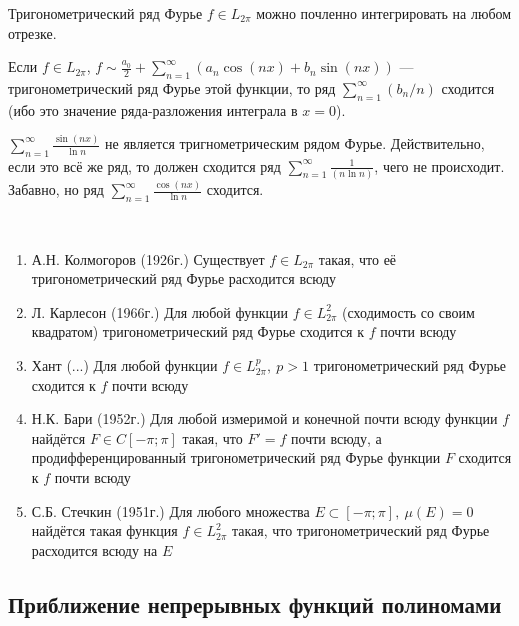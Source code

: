 \begin{corollary}
	Тригонометрический ряд Фурье $f \in L_{2\pi}$ можно почленно интегрировать на любом отрезке.
\end{corollary}

\begin{corollary}
	Если $f \in L_{2\pi}$, $f \sim \frac{a_0}{2} + \sum_{n = 1}^\infty (a_n\cos(nx) + b_n\sin(nx))$ --- тригонометрический ряд Фурье этой функции, то ряд $\sum_{n = 1}^\infty (b_n / n)$ сходится (ибо это значение ряда-разложения интеграла в $x = 0$).
\end{corollary}

\begin{example}
	$\sum_{n = 1}^\infty \frac{\sin(nx)}{\ln n}$ не является тригнометрическим рядом Фурье. Действительно, если это всё же ряд, то должен сходится ряд $\sum_{n = 1}^\infty \frac{1}{(n\ln n)}$, чего не происходит. Забавно, но ряд $\sum_{n = 1}^\infty \frac{\cos(nx)}{\ln n}$ сходится.
\end{example}

\begin{note}~
	\begin{enumerate}
		\item А.Н. Колмогоров (1926г.) Существует $f \in L_{2\pi}$ такая, что её тригонометрический ряд Фурье расходится всюду
		
		\item Л. Карлесон (1966г.) Для любой функции $f \in L_{2\pi}^2$ (сходимость со своим квадратом) тригонометрический ряд Фурье сходится к $f$ почти всюду
		
		\item Хант (...) Для любой функции $f \in L_{2\pi}^p,\ p > 1$ тригонометрический ряд Фурье сходится к $f$ почти всюду
		
		\item Н.К. Бари (1952г.) Для любой измеримой и конечной почти всюду функции $f$ найдётся $F \in C[-\pi; \pi]$ такая, что $F' = f$ почти всюду, а продифференцированный тригонометрический ряд Фурье функции $F$ сходится к $f$ почти всюду
		
		\item С.Б. Стечкин (1951г.) Для любого множества $E \subset [-\pi; \pi],\ \mu(E) = 0$ найдётся такая функция $f \in L_{2\pi}^2$ такая, что тригонометрический ряд Фурье расходится всюду на $E$
	\end{enumerate}
\end{note}

\subsection{Приближение непрерывных функций полиномами}

